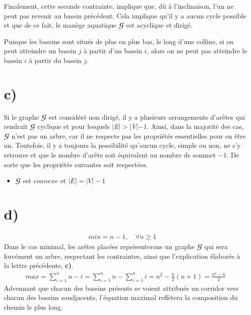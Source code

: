 \documentclass[11pt,a4paper, oneside, oldfontcommands]{memoir}
\newcommand{\G}{$\mathbfcal{G}$}
\newcommand{\V}{$\textit{V}$}
\newcommand{\E}{$\textit{E}$}
\begin{document}
  
  Finalement, cette seconde contrainte, implique que, dû à l'inclinaison, l'un ne peut pas revenir au bassin précédent. Cela implique qu'il y a aucun cycle possible et que de ce fait, le manège aquatique \G{} est acyclique et dirigé.\\
  
  \begin{siderules}
    Puisque les bassins sont situés de plus en plus bas, le long d'une colline, si on peut atteindre un bassin $j$ à partir d'un bassin $i$, alors on ne peut pas atteindre le bassin $i$ à partir du bassin $j$.
  \end{siderules}


\section{c)}
Si le graphe \G{} est considéré non dirigé, il y a plusieurs arrangements d'arêtes qui rendrait \G{} cyclique et pour lesquels $|\E{}| > |\V{}| - 1$. Ainsi, dans la majorité des cas, \G{} n'est pas un arbre, car il ne respecte pas les propriétés essentielles pour en être un. Toutefois, il y a toujours la possibilité qu'aucun cycle, simple ou non, ne s'y retrouve et que le nombre d'arête soit équivalent au nombre de sommet $- 1$. De sorte que les propriétés suivantes soit respectées.\\
  \begin{itemize}
    \item\G{} est $connexe$ et $|\textit{E}| = |\textit{V}| - 1$
  \end{itemize} 

\section{d)}
  \begin{gather*}
    min = n-1,\quad \forall n \geq 1\quad
  \end{gather*}
  Dans le cas minimal, les arêtes placées représenterons un graphe \G{} qui sera forcément un arbre, respectant les contraintes, ainsi que l'explication élaborée à la lettre précédente, \textbf{c)}.\\
  \begin{gather*}
    max = \sum_{i=1}^{n} {n-i}=\sum_{i=1}^{n} {n}-\sum_{i=1}^{n} {i}=n^{2}-\frac{n}{2}(n+1)=\frac{n^{2}-n}{2}
  \end{gather*}
  Advennant que chacun des bassins présents se voient attribués un corridor vers chacun des bassins soudjacents, l'équation maximal reflètera la composition du chemin le plus long. 
\end{document}
